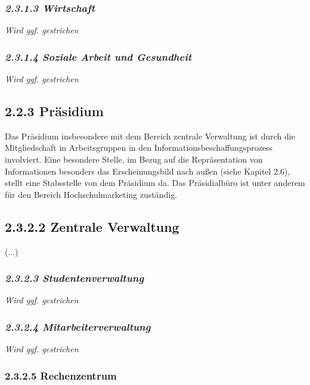 \documentclass[a4paper]{article}
\begin{document}
\subsubsection[2.3.1.3 Wirtschaft ]{\itshape 2.3.1.3 Wirtschaft }
{\sffamily\itshape\color{black}
Wird ggf. gestrichen}

\subsubsection[2.3.1.4 Soziale Arbeit und Gesundheit]{\itshape 2.3.1.4 Soziale Arbeit und Gesundheit}
{\sffamily\itshape\color{black}
Wird ggf. gestrichen}

\subsection[2.2.3 Präsidium]{\bfseries 2.2.3 Präsidium}
{\sffamily\mdseries\color{black}
Das Präsidium insbesondere mit dem Bereich zentrale Verwaltung ist durch die Mitgliedschaft in Arbeitsgruppen in den
Informationsbeschaffungsprozess involviert. Eine besondere Stelle, im Bezug auf die Repräsentation von Informationen
besonders das Erscheinungsbild nach außen (siehe Kapitel 2.6), stellt eine Stabsstelle von dem Präsidium da. Das
Präsidialbüro ist unter anderem für den Bereich Hochschulmarketing zuständig.}

\subsection[2.3.2.2 Zentrale Verwaltung ]{\bfseries 2.3.2.2 Zentrale Verwaltung }
{\sffamily\mdseries\color{black}
(...)}

\subsubsection[2.3.2.3 Studentenverwaltung]{\itshape 2.3.2.3 Studentenverwaltung}
{\sffamily\itshape\color{black}
Wird ggf. gestrichen }

\subsubsection[2.3.2.4 Mitarbeiterverwaltung]{\itshape 2.3.2.4 Mitarbeiterverwaltung}
{\sffamily\itshape\color{black}
Wird ggf. gestrichen}

\subsubsection{2.3.2.5 Rechenzentrum }
\end{document}
